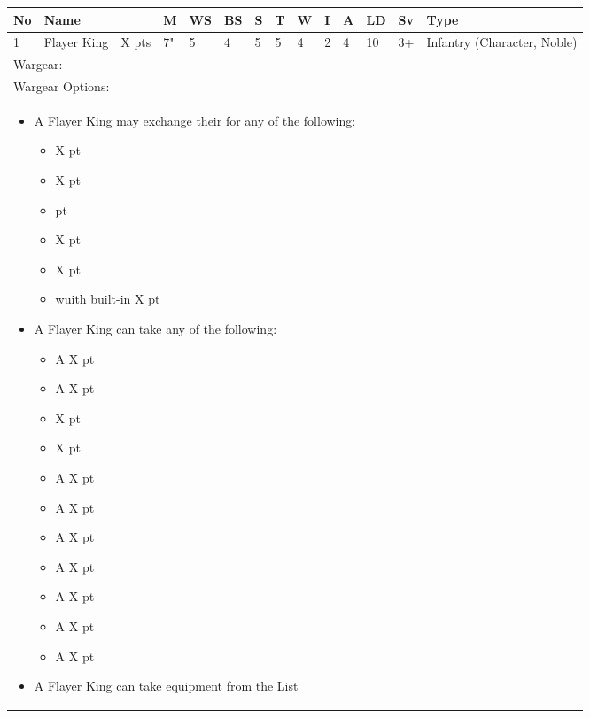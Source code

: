 \noindent
\begin{tabular}{||m{10pt} m{95pt} m{30pt} m{11pt} m{11pt} m{11pt} m{11pt} m{11pt} m{11pt} m{11pt} m{11pt} m{11pt} m{11pt} m{125pt}||}
	\hline
	No & Name & & M & WS & BS & S & T & W & I & A & LD & Sv & Type \\
	\hline
	1 & Flayer King & X pts & 7" & 5 & 4 & 5 & 5 & 4 & 2 & 4 & 10 & 3+ & Infantry (Character, Noble)\\
	\hline
	\hline
	\multicolumn{14}{||Z{532 pt}||}{Wargear: \quickref{Staff of Light}}\\
	\multicolumn{14}{||Z{532 pt}||}{Wargear Options:} \\	
	\multicolumn{14}{||Z{532 pt}||}{\begin{itemize}
			\item A Flayer King may exchange their \quickref{Staff of Light} for any of the following:
			\begin{itemize}
				\item \quickref{Hyperphase Sword} \hrulefill X pt
				\item \quickref{Rod of Night} \hrulefill X pt
				\item \quickref{Voidblade} \hrulefill 0 pt
				\item \quickref{Voidscythe} \hrulefill X pt
				\item \quickref{Warscythe} \hrulefill X pt
				\item \quickref{Warscythe} wuith built-in \quickref{Relic Gauss Blaster} \hrulefill X pt
			\end{itemize}
			\item A Flayer King can take any of the following:
			\begin{itemize}
				\item A \quickref{Gauntlet of Fire} \hrulefill X pt
				\item A \quickref{Tachyon Arrow} \hrulefill X pt
				\item \quickref{Bloodswarm Scarabs} \hrulefill X pt
				\item \quickref{Mindshackle Scarabs} \hrulefill X pt
				\item A \quickref{Phase Shifter} \hrulefill X pt
				\item A \quickref{Phylactery} \hrulefill X pt
				\item A \quickref{Resurrection Orb} \hrulefill X pt
				\item A \quickref{Sempiternal Weave} \hrulefill X pt
				\item A \quickref{Shadow Ankh} \hrulefill X pt
				\item A \quickref{Tesseract Labyrinth} \hrulefill X pt
				\item A \quickref{Translocation Shroud} \hrulefill X pt
			\end{itemize}
			\item A Flayer King can take equipment from the \quickref{Artefacts of the Aeons} List
	\end{itemize}} \\	
	
\end{tabular}

